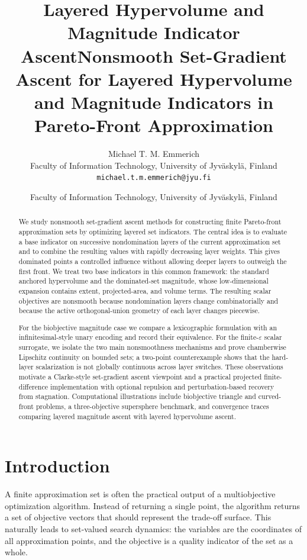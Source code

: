 \documentclass{article}
\title{Layered Hypervolume and Magnitude Indicator Ascent}
\title{Nonsmooth Set-Gradient Ascent for Layered Hypervolume and Magnitude Indicators in Pareto-Front Approximation}
\author{
Michael T. M. Emmerich\\
Faculty of Information Technology, University of Jyväskylä, Finland\\
\texttt{michael.t.m.emmerich@jyu.fi}
}
\date{Faculty of Information Technology, University of Jyväskylä, Finland}
\begin{document}
\maketitle

\begin{abstract}
We study nonsmooth set-gradient ascent methods for constructing finite Pareto-front approximation sets by optimizing layered set indicators.  The central idea is to evaluate a base indicator on successive nondomination layers of the current approximation set and to combine the resulting values with rapidly decreasing layer weights.  This gives dominated points a controlled influence without allowing deeper layers to outweigh the first front.  We treat two base indicators in this common framework: the standard anchored hypervolume and the dominated-set magnitude, whose low-dimensional expansion contains extent, projected-area, and volume terms.  The resulting scalar objectives are nonsmooth because nondomination layers change combinatorially and because the active orthogonal-union geometry of each layer changes piecewise.

For the biobjective magnitude case we compare a lexicographic formulation with an infinitesimal-style unary encoding and record their equivalence.  For the finite-$\varepsilon$ scalar surrogate, we isolate the two main nonsmoothness mechanisms and prove chamberwise Lipschitz continuity on bounded sets; a two-point counterexample shows that the hard-layer scalarization is not globally continuous across layer switches.  These observations motivate a Clarke-style set-gradient ascent viewpoint and a practical projected finite-difference implementation with optional repulsion and perturbation-based recovery from stagnation.  Computational illustrations include biobjective triangle and curved-front problems, a three-objective supersphere benchmark, and convergence traces comparing layered magnitude ascent with layered hypervolume ascent.
\end{abstract}

\section{Introduction}
A finite approximation set is often the practical output of a multiobjective optimization algorithm.  Instead of returning a single point, the algorithm returns a set of objective vectors that should represent the trade-off surface.  This naturally leads to set-valued search dynamics: the variables are the coordinates of all approximation points, and the objective is a quality indicator of the set as a whole.
\end{document}
